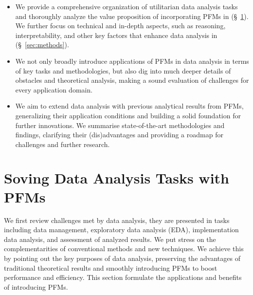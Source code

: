   \begin{itemize}
      \item We provide a comprehensive organization of utilitarian data analysis tasks and thoroughly analyze the value proposition of incorporating PFMs in (\S~\ref{sec:task_solving}). We further focus on technical and in-depth aspects, such as reasoning, interpretability, and other key factors that enhance data analysis in (\S~\ref{sec:methods}).
      
      \item We not only broadly introduce applications of PFMs in data analysis in terms of key tasks and methodologies, but also dig into much deeper details of obstacles and theoretical analysis, making a sound evaluation of challenges for every application domain.
      
      \item We aim to extend data analysis with previous analytical results from PFMs, generalizing their application conditions and building a solid foundation for further innovations. We summarise state-of-the-art methodologies and findings, clarifying their (dis)advantages and providing a roadmap for challenges and further research.
  
  \end{itemize}
  
  
  
  
  \section{Soving Data Analysis Tasks with PFMs}\label{sec:task_solving}
  
  We first review challenges met by data analysis, they are presented in tasks including data management, exploratory data analysis (EDA), implementation data analysis, and assessment of analyzed results. We put stress on the complementarities of conventional methods and new techniques. We achieve this by pointing out the key purposes of data analysis, preserving the advantages of traditional theoretical results and smoothly introducing PFMs to boost performance and efficiency. This section formulate the applications and benefits of introducing PFMs.
  
  
  \vspace{1cm} %
  \newlength{\leftParentNodeWidth}
  \setlength{\leftParentNodeWidth}{3cm} %
  

